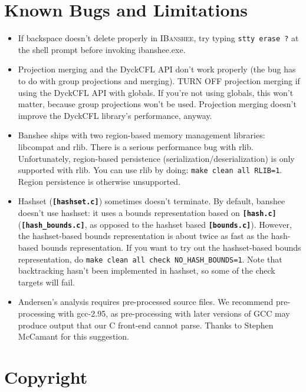 \documentclass[10pt]{article}
\newcommand{\ibanshee}{\textsc{IBanshee}}
\newcommand{\file}[1]{\texttt{\textbf{[#1]}}}
\begin{document}
\section{Known Bugs and Limitations}
\label{app-bugs}

\begin{itemize}

\item If backspace doesn't delete properly in \ibanshee{}, try typing
  \texttt{stty erase ?} at the shell prompt before invoking
  ibanshee.exe.

\item Projection merging and the DyckCFL API don't work properly (the
  bug has to do with group projections and merging). TURN OFF
  projection merging if using the DyckCFL API with globals. If you're
  not using globals, this won't matter, because group projections
  won't be used. Projection merging doesn't improve the DyckCFL
  library's performance, anyway.

\item Banshee ships with two region-based memory management libraries:
  libcompat and rlib. There is a serious performance bug with
  rlib. Unfortunately, region-based persistence
  (serialization/deserialization) is only supported with rlib. You can
  use rlib by doing: \texttt{make clean all RLIB=1}. Region
  persistence is otherwise unsupported.

\item Hashset (\file{hashset.c}) sometimes doesn't terminate. By
  default, banshee doesn't use hashset: it uses a bounds
  representation based on \file{hash.c} (\file{hash\_bounds.c}, as
  opposed to the hashset based \file{bounds.c}). However, the
  hashset-based bounds representation is about twice as fast as the
  hash-based bounds representation. If you want to try out the
  hashset-based bounds representation, do \texttt{make clean all check
    NO\_HASH\_BOUNDS=1}. Note that backtracking hasn't been
  implemented in hashset, so some of the check targets will fail.

\item Andersen's analysis requires pre-processed source files. We
  recommend pre-processing with gcc-2.95, as pre-processing with later
  versions of GCC may produce output that our C front-end cannot
  parse. Thanks to Stephen McCamant for this suggestion.

\end{itemize}

\section{Copyright}
\label{app-copyright}
\end{document}
